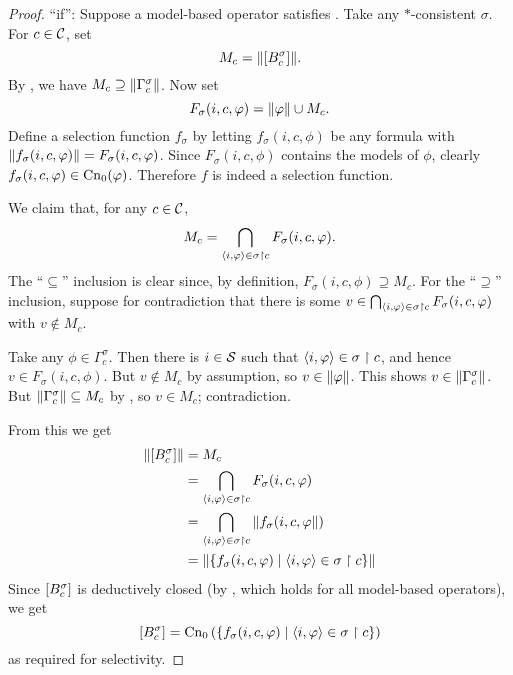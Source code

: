 \begin{proof}
    ``if'': Suppose a model-based operator satisfies \boundedness{}. Take any
    $\ast$-consistent $\sigma$. For $c \in \mathcal{C}$, set
    \[
        M_c = \|{\left[{B^\sigma_c}\right]}\|.
    \]
    By \boundedness{}, we have $M_c \supseteq \|{\Gamma^\sigma_c}\|$. Now
    set
    \[
        F_\sigma(i, c, \varphi) = \|{\varphi}\| \cup M_c.
    \]
    Define a selection function $f_\sigma$ by letting $f_\sigma(i, c, \phi)$ be
    any formula with $\|{f_\sigma(i,c, \varphi)}\| = F_\sigma(i, c, \varphi)$.
    Since $F_\sigma(i, c, \phi)$ contains the models of $\phi$, clearly
    $f_\sigma(i, c, \varphi) \in \operatorname{Cn}_0(\varphi)$. Therefore $f$ is indeed a
    selection function.

    We claim that, for any $c \in \mathcal{C}$,
    \[
        M_c
        = \bigcap_{\langle {i, \varphi} \rangle \in \sigma \upharpoonright c}{
            F_\sigma(i, c, \varphi)
        }.
    \]
    The ``$\subseteq$'' inclusion is clear since, by definition, $F_\sigma(i, c,
    \phi) \supseteq M_c$. For the ``$\supseteq$'' inclusion, suppose for
    contradiction that there is some $v \in \bigcap_{\langle {i, \varphi} \rangle \in \sigma
    \upharpoonright c}{F_\sigma(i, c, \varphi)}$ with $v \notin M_c$.

    Take any $\phi \in \Gamma^\sigma_c$. Then there is $i \in \mathcal{S}$ such that
    $\langle {i, \varphi} \rangle \in \sigma \upharpoonright c$, and hence $v \in F_\sigma(i, c, \phi)$.
    But $v \notin M_c$ by assumption, so $v \in \|{\varphi}\|$. This shows $v
    \in \|{\Gamma^\sigma_c}\|$. But $\|{\Gamma^\sigma_c}\| \subseteq
    M_c$ by \boundedness{}, so $v \in M_c$; contradiction.

    From this we get
    \begin{align*}
        \|{\left[{B^\sigma_c}\right]}\|
        &= M_c \\
        &= \bigcap_{\langle {i, \varphi} \rangle \in \sigma \upharpoonright c}{F_\sigma(i, c, \varphi)} \\
        &= \bigcap_{\langle {i, \varphi} \rangle \in \sigma \upharpoonright c}{
            \|{f_\sigma(i, c, \varphi}\|)
        } \\
        &= \|{\{
            f_\sigma(i, c, \varphi) \mid \langle {i, \varphi} \rangle \in \sigma \upharpoonright c
        \}}\|
    \end{align*}
    Since $\left[{B^\sigma_c}\right]$ is deductively closed (by \closure{}, which
    holds for all model-based operators), we get
    \[
        \left[{B^\sigma_c}\right]
        =
        \operatorname{Cn}_0\left(\{
            f_\sigma(i, c, \varphi) \mid \langle {i, \varphi} \rangle \in \sigma \upharpoonright c
        \}\right)
    \]
    as required for selectivity.


\end{proof}
